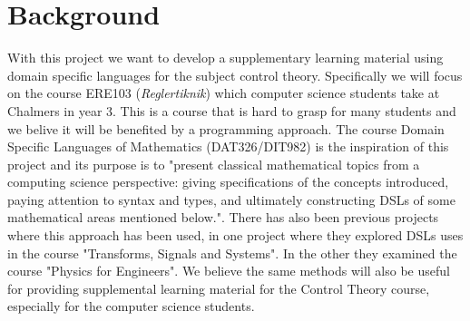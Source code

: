 \section{Background}
With this project we want to develop a supplementary learning material using domain specific languages for the subject control theory. Specifically we will focus on the course ERE103 (\textit{Reglertiknik}) which computer science students take at Chalmers in year 3. This is a course that is hard to grasp for many students and we belive it will be benefited by a programming approach. The course Domain Specific Languages of Mathematics (DAT326/DIT982) is the inspiration of this project and its purpose is to "present classical mathematical topics from a computing science perspective: giving specifications of the concepts introduced, paying attention to syntax and types, and ultimately constructing DSLs of some mathematical areas mentioned below.". There has also been previous projects where this approach has been used, in one project where they explored DSLs uses in the course "Transforms, Signals and Systems". In the other they examined the course "Physics for Engineers". %
We believe the same methods will also be useful for providing supplemental learning material for the Control Theory course, especially for the computer science students.
\iffalse
Anteckningar(Slids):

Vad är ämnet/problemet som ska undersökas? 
Varför har ämnet/problemet uppkommit? 
Varför är det ett relevant eller intressant ämne/problem? 
För vem? 
Kan det specifika ämnet/problemet relateras till en mer generell diskussion?
\fi